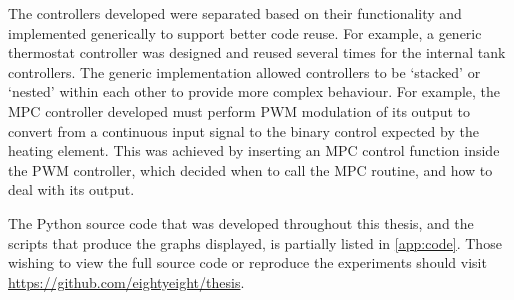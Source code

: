 The controllers developed were separated based on their functionality and implemented generically to support better code reuse.
For example, a generic thermostat controller was designed and reused several times for the internal tank controllers.
The generic implementation allowed controllers to be `stacked' or `nested' within each other to provide more complex behaviour.
For example, the MPC controller developed must perform PWM modulation of its output to convert from a continuous input signal to the binary control expected by the heating element.
This was achieved by inserting an MPC control function inside the PWM controller, which decided when to call the MPC routine, and how to deal with its output.

The Python source code that was developed throughout this thesis, and the scripts that produce the graphs displayed, is partially listed in \autoref{app:code}.
Those wishing to view the full source code or reproduce the experiments should visit \url{https://github.com/eightyeight/thesis}.
